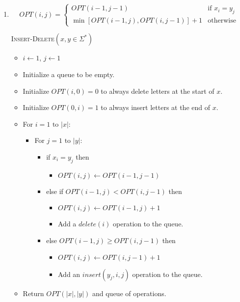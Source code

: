 \documentclass[12pt]{article}
\begin{document}
\begin{enumerate}
\item %

\begin{displaymath}
OPT(i,j) = \left\{ \begin{array}{ll}
OPT(i-1,j-1) & \textrm{if $x_i = y_j$}\\
\min\left[OPT(i-1,j),OPT(i,j-1)\right] + 1 & \textrm{otherwise}
\end{array} \right.
\end{displaymath}

\textsc{Insert-Delete}$(x,y \in \Sigma^*)$
\begin{itemize}
\item
$i \gets 1$, $j \gets 1$
\item
Initialize a queue to be empty.
\item
Initialize $OPT(i,0) = 0$ to always delete letters at the start of $x$.
\item
Initialize $OPT(0,i) = 1$ to always insert letters at the end of $x$.
\item
For $i = 1 \textrm{ to } |x|$:
\begin{itemize}
\item
For $j = 1 \textrm{ to } |y|$:
\begin{itemize}
\item
if $x_i = y_j$ then
\begin{itemize}
\item $OPT(i,j) \gets OPT(i-1,j-1)$
\end{itemize}
\item
else if $OPT(i-1,j)<OPT(i,j-1)$ then
\begin{itemize}
\item $OPT(i,j) \gets OPT(i-1,j) + 1$
\item Add a $delete(i)$ operation to the queue.
\end{itemize}
\item
else $OPT(i-1,j)\ge OPT(i,j-1)$ then
\begin{itemize}
\item $OPT(i,j) \gets OPT(i,j-1) + 1$
\item Add an $insert(y_j,i,j)$ operation to the queue.
\end{itemize}

\end{itemize}

\end{itemize}
\item Return $OPT(|x|,|y|)$ and queue of operations.
\end{itemize}


\end{enumerate}
\end{document}
